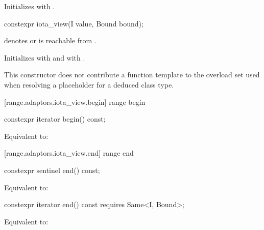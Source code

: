\begin{addedblock}
\begin{itemdescr}
\pnum
\effects Initializes  with .
\end{itemdescr}

%
\begin{itemdecl}
constexpr iota_view(I value, Bound bound);
\end{itemdecl}

\begin{itemdescr}
\pnum
\expects
{} denotes  or
 is reachable from .

\pnum
\effects Initializes  with  and
 with .

\pnum
\remarks This constructor does not contribute a function template to the overload
set used when resolving a placeholder for a deduced class
type.
\end{itemdescr}

[range.adaptors.iota_view.begin]{ range begin}

%
\begin{itemdecl}
constexpr iterator begin() const;
\end{itemdecl}

\begin{itemdescr}
\pnum
\effects Equivalent to: 
\end{itemdescr}

[range.adaptors.iota_view.end]{ range end}

%
\begin{itemdecl}
constexpr sentinel end() const;
\end{itemdecl}

\begin{itemdescr}
\pnum
\effects Equivalent to: 
\end{itemdescr}

%
\begin{itemdecl}
constexpr iterator end() const requires Same<I, Bound>;
\end{itemdecl}

\begin{itemdescr}
\pnum
\effects Equivalent to: 
\end{itemdescr}


\end{addedblock}
